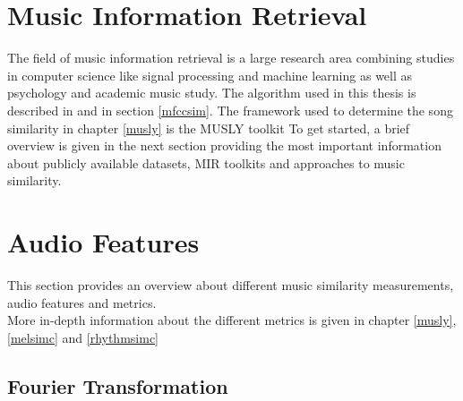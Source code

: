 \section{Music Information Retrieval}
The field of music information retrieval is a large research area combining studies in computer science like signal processing and machine learning as well as psychology and academic music study.
The algorithm used in this thesis is described in \cite[pp. 17ff]{schnitzer1} and in section \ref{mfccsim}.
The framework used to determine the song similarity in chapter \ref{musly} is the MUSLY toolkit \cite{musly1}
To get started, a brief overview is given in the next section providing the most important information about publicly available datasets, MIR toolkits and approaches to music similarity.

\section{Audio Features}

This section provides an overview about different music similarity measurements, audio features and metrics.\\
More in-depth information about the different metrics is given in chapter \ref{musly}, \ref{melsimc} and \ref{rhythmsimc}

\subsection{Fourier Transformation}\label{featsec}

